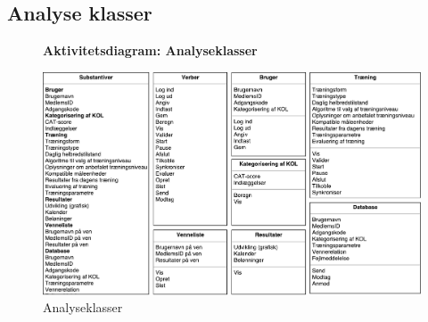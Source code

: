 \subsection{Analyse klasser}


\begin{figure} [H]
\centering
\textbf{Aktivitetsdiagram: Analyseklasser}\par\medskip
\includegraphics[width=1\textwidth]{figures/aktivitetsdiagram/analyseklasser}
\caption{Analyseklasser}
\label{fig:traening}
\end{figure}